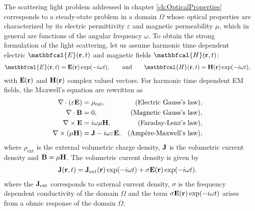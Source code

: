 
The scattering light problem addressed in chapter \ref{ch:OpticalProperties} corresponds to a steady-state problem in a domain $\Omega$ whose optical properties are characterized by its electric permittivity $\varepsilon$ and magnetic permeability $\mu$, which in general are functions of the angular frequency $\omega$. To obtain the strong formulation of the light scattering, let us assume harmonic time dependent electric $\mathbfcal{E}(\vb{r},t)$ and magnetic fields $\mathbfcal{H}(\vb{r},t)$:
%
\begin{align}
    \mathbfcal{E}(\vb{r},t) = \vb{E}(\vb{r})\exp(-i\omega t),
        \qquad
        \text{and}
        \qquad
    \mathbfcal{H}(\vb{r},t) =  \vb{H}(\vb{r}) \exp(-i\omega t),
\end{align}
%
with $ \vb{E}(\vb{r})$ and $ \vb{H}(\vb{r})$ complex valued vectors. For harmonic time dependent EM fields, the Maxwell's equation are rewritten as \cite{jin_theory_2010,larson_finite_2013}
%
\begin{subequations}
    \label{eq:MaxwellsEq}
\begin{align}
    \nabla \cdot \qty(\varepsilon \vb{E})  &= \rho_\text{ext},  &\mbox{(Electric Gauss's law)},\\
    \nabla \cdot   \vb{B} &= 0, & \mbox{(Magnetic Gauss's law)},
            \label{eq:GaussM}\\
    \nabla \times \vb{E}  &= i\omega \mu \vb{H},  &  \mbox{(Faraday-Lenz's law)},\\
    \nabla \times \qty(\mu \vb{H})  &= \vb{J} - i\omega \varepsilon \vb{E}, & \mbox{(Ampère-Maxwell's law)},
\end{align}
\end{subequations}
%
where  $\rho_\text{ext}$ is the external volumetric charge density, $\vb{J}$ is the volumetric current density and  $\vb{B} = \mu \vb{H}$. The volumetric current density is given by \cite{larson_finite_2013}
%
\begin{align}
    \vb{J}(\vb{r},t) = \vb{J}_\text{ext}(\vb{r})\exp(-i\omega t) + \sigma \vb{E}(\vb{r})\exp(-i\omega t).
    \label{eq:ohmic}
\end{align}
%
where the $\vb{J}_\text{ext}$ corresponds to external current density, $\sigma$ is the frequency dependent conductivity of the domain $\Omega$ and the term $\sigma \vb{E}(\vb{r})\exp(-i\omega t)$ arises from a ohmic response of the domain $\Omega$.

